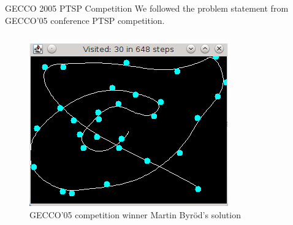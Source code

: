 \documentclass[final,t]{beamer}
\begin{document}
\begin{frame}{}
\begin{columns}[t]
\begin{column}{.305\linewidth}
      \begin{block}{GECCO 2005 PTSP Competition}
        We followed the problem statement from GECCO'05 conference PTSP competition. 
        \begin{columns}[T]
          \begin{column}{.53\linewidth} 
            \begin{figure}
              \centering
              \includegraphics[width=\linewidth]{byrod_solution1.png}          
              \caption{GECCO'05 competition winner Martin Byr\"{o}d's solution}
            \end{figure}
          \end{column}


\end{columns}
\end{block}
\end{column}
\end{columns}
\end{frame}
\end{document}
